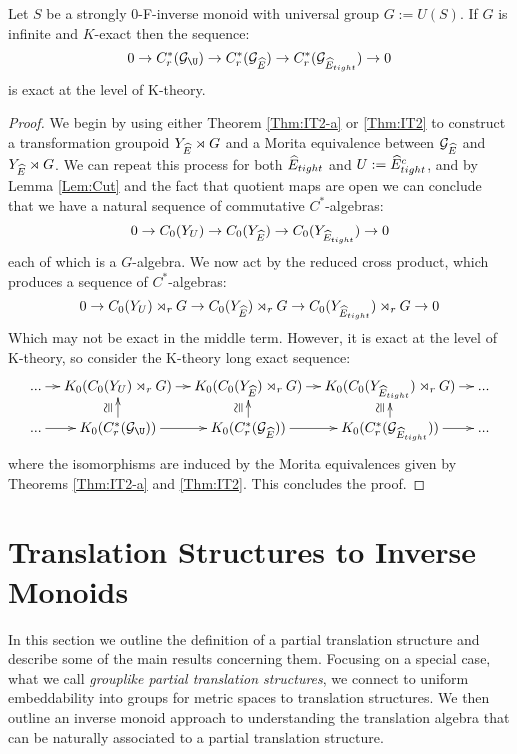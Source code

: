 \begin{corollary}
\begin{theorem}\label{thm:PV2}
Let $S$ be a strongly $0$-F-inverse monoid with universal group $G:=U(S)$. If $G$ is infinite and $K$-exact then the sequence:
\begin{equation*}
0 \rightarrow C^{*}_{r}(\G_{\U}) \rightarrow C^{*}_{r}(\G_{\E}) \rightarrow C^{*}_{r}(\G_{\E_{tight}}) \rightarrow 0
\end{equation*}
is exact at the level of K-theory.  
\end{theorem}
\begin{proof}
We begin by using either Theorem \ref{Thm:IT2-a} or \ref{Thm:IT2} to construct a transformation groupoid $Y_{\widehat{E}}\rtimes G$ and a Morita equivalence between $\mathcal{G}_{\widehat{E}}$ and $Y_{\widehat{E}}\rtimes G$. We can repeat this process for both $\widehat{E}_{tight}$ and $U:=\widehat{E}_{tight}^{c}$, and by Lemma \ref{Lem:Cut} and the fact that quotient maps are open we can conclude that we have a natural sequence of commutative $C^{*}$-algebras:
\begin{equation*}
0 \rightarrow C_{0}(Y_{U}) \rightarrow C_{0}(Y_{\widehat{E}}) \rightarrow C_{0}(Y_{\widehat{E}_{tight}}) \rightarrow 0
\end{equation*}
each of which is a $G$-algebra. We now act by the reduced cross product, which produces a sequence of $C^{*}$-algebras:
\begin{equation*}
0 \rightarrow C_{0}(Y_{U})\rtimes_{r}G \rightarrow C_{0}(Y_{\widehat{E}})\rtimes_{r}G \rightarrow C_{0}(Y_{\widehat{E}_{tight}})\rtimes_{r}G \rightarrow 0
\end{equation*}
Which may not be exact in the middle term. However, it is exact at the level of K-theory, so consider the K-theory long exact sequence:
\begin{equation*}
\xymatrix@=1em{...\ar[r] & K_{0}(C_{0}(Y_{U})\rtimes_{r} G) \ar[r]& K_{0}(C_{0}(Y_{\E})\rtimes_{r} G) \ar[r]& K_{0}(C_{0}(Y_{\E_{tight}})\rtimes_{r} G)\ar[r] & ...\\
...\ar[r] & K_{0}(C^{*}_{r}(\G_{\U})) \ar[r]\ar[u]^{\ucong}& K_{0}(C^{*}_{r}(\G_{\E})) \ar[r]\ar[u]^{\ucong}& K_{0}(C^{*}_{r}(\G_{\E_{tight}})) \ar[r]\ar[u]^{\ucong}& ...}
\end{equation*}
where the isomorphisms are induced by the Morita equivalences given by Theorems \ref{Thm:IT2-a} and \ref{Thm:IT2}. This concludes the proof.
\end{proof}


\section{Translation Structures to Inverse Monoids}
In this section we outline the definition of a partial translation structure and describe some of the main results concerning them. Focusing on a special case, what we call \textit{grouplike partial translation structures}, we connect to uniform embeddability into groups for metric spaces to translation structures.  We then outline an inverse monoid approach to understanding the translation algebra that can be naturally associated to a partial translation structure.


\end{corollary}
